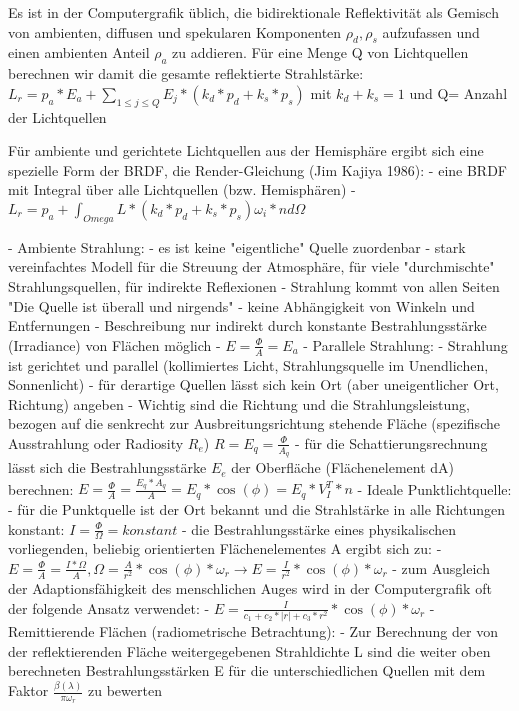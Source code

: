 \documentclass[10pt,landscape]{article}
\begin{document}
\begin{multicols}{3}
Es ist in der Computergrafik üblich, die bidirektionale Reflektivität als Gemisch von ambienten, diffusen und spekularen Komponenten $ρ_d, ρ_s$ aufzufassen und
einen ambienten Anteil $ρ_a$ zu addieren. Für eine Menge Q von Lichtquellen berechnen wir damit die gesamte reflektierte Strahlstärke: $L_r=p_a*E_a+\sum_{1\leq j \leq Q} E_j * (k_d*p_d + k_s*p_s)$ mit $k_d+k_s=1$ und Q= Anzahl der Lichtquellen

Für ambiente und gerichtete Lichtquellen aus der Hemisphäre ergibt sich eine spezielle Form der BRDF, die Render-Gleichung (Jim Kajiya 1986):
- eine BRDF mit Integral über alle Lichtquellen (bzw. Hemisphären)
- $L_r=p_a + \int_{Omega} L*(k_d*p_d+k_s*p_s) \omega_i*n d\Omega$


- Ambiente Strahlung:
  - es ist keine "eigentliche" Quelle zuordenbar
  - stark vereinfachtes Modell für die Streuung der Atmosphäre, für viele "durchmischte" Strahlungsquellen, für indirekte Reflexionen
  - Strahlung kommt von allen Seiten "Die Quelle ist überall und nirgends"
  - keine Abhängigkeit von Winkeln und Entfernungen
  - Beschreibung nur indirekt durch konstante Bestrahlungsstärke (Irradiance) von Flächen möglich
  - $E=\frac{\Phi}{A}=E_a$
- Parallele Strahlung:
  - Strahlung ist gerichtet und parallel (kollimiertes Licht, Strahlungsquelle im Unendlichen, Sonnenlicht)
  - für derartige Quellen lässt sich kein Ort (aber uneigentlicher Ort, Richtung) angeben
  - Wichtig sind die Richtung und die Strahlungsleistung, bezogen auf die senkrecht zur Ausbreitungsrichtung stehende Fläche (spezifische Ausstrahlung oder Radiosity $R_e$) $R=E_q=\frac{\Phi}{A_q}$
  - für die Schattierungsrechnung lässt sich die Bestrahlungsstärke $E_e$ der Oberfläche (Flächenelement dA) berechnen: $E=\frac{\Phi}{A}=\frac{E_q*A_q}{A}=E_q*\cos(\phi) = E_q*V_I^T*n$
- Ideale Punktlichtquelle:
  - für die Punktquelle ist der Ort bekannt und die Strahlstärke in alle Richtungen konstant: $I=\frac{\Phi}{\Omega}=konstant$
  - die Bestrahlungsstärke eines physikalischen vorliegenden, beliebig orientierten Flächenelementes A ergibt sich zu:
    - $E=\frac{\Phi}{A}=\frac{I*\Omega}{A}, \Omega=\frac{A}{r^2}*\cos(\phi)*\omega_r \rightarrow E=\frac{I}{r^2}*\cos(\phi)*\omega_r$
  - zum Ausgleich der Adaptionsfähigkeit des menschlichen Auges wird in der Computergrafik oft der folgende Ansatz verwendet:
    - $E=\frac{I}{c_1+c_2*|r|+c_3*r^2}*\cos(\phi)*\omega_r$
- Remittierende Flächen (radiometrische Betrachtung):
  - Zur Berechnung der von der reflektierenden Fläche weitergegebenen Strahldichte L sind die weiter oben berechneten Bestrahlungsstärken E für die unterschiedlichen Quellen mit dem Faktor $\frac{\beta(\lambda)}{\pi\omega_r}$ zu bewerten


\end{multicols}
\end{document}
